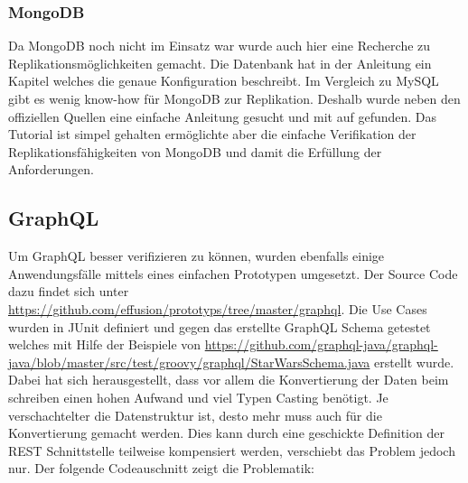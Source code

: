 \subsubsection{MongoDB}

Da MongoDB noch nicht im Einsatz war wurde auch hier eine Recherche zu Replikationsmöglichkeiten gemacht. Die Datenbank hat in der Anleitung ein Kapitel \cite{mongorep} welches die genaue Konfiguration beschreibt. Im Vergleich zu MySQL gibt es wenig know-how für MongoDB zur Replikation. Deshalb wurde neben den offiziellen Quellen eine einfache Anleitung gesucht und mit \cite{mongorep2} auf gefunden. Das Tutorial ist simpel gehalten ermöglichte aber die einfache Verifikation der Replikationsfähigkeiten von MongoDB und damit die Erfüllung der Anforderungen.
\newpage

\subsection{GraphQL}

Um GraphQL besser verifizieren zu können, wurden ebenfalls einige Anwendungsfälle mittels eines einfachen Prototypen umgesetzt. Der Source Code dazu findet sich unter \url{https://github.com/effusion/prototyps/tree/master/graphql}. Die Use Cases wurden in JUnit definiert und gegen das erstellte GraphQL Schema getestet welches mit Hilfe der Beispiele von \url{https://github.com/graphql-java/graphql-java/blob/master/src/test/groovy/graphql/StarWarsSchema.java} erstellt wurde. Dabei hat sich herausgestellt, dass vor allem die Konvertierung der Daten beim schreiben einen hohen Aufwand und viel Typen Casting benötigt. Je verschachtelter die Datenstruktur ist, desto mehr muss auch für die Konvertierung gemacht werden. Dies kann durch eine geschickte Definition der REST Schnittstelle teilweise kompensiert werden, verschiebt das Problem jedoch nur. Der folgende Codeauschnitt zeigt die Problematik:

